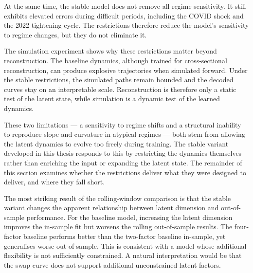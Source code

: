 At the same time, the stable model does not remove all regime sensitivity. It still exhibits elevated errors during difficult periods, including the COVID shock and the 2022 tightening cycle. The restrictions therefore reduce the model's sensitivity to regime changes, but they do not eliminate it.

The simulation experiment shows why these restrictions matter beyond reconstruction. The baseline dynamics, although trained for cross-sectional reconstruction, can produce explosive trajectories when simulated forward. Under the stable restrictions, the simulated paths remain bounded and the decoded curves stay on an interpretable scale. Reconstruction is therefore only a static test of the latent state, while simulation is a dynamic test of the learned dynamics.

These two limitations --- a sensitivity to regime shifts and a structural inability to reproduce slope and curvature in atypical regimes --- both stem from allowing the latent dynamics to evolve too freely during training. The stable variant developed in this thesis responds to this by restricting the dynamics themselves rather than enriching the input or expanding the latent state. The remainder of this section examines whether the restrictions deliver what they were designed to deliver, and where they fall short.




The most striking result of the rolling-window comparison is that the stable variant changes the apparent relationship between latent dimension and out-of-sample performance. For the baseline model, increasing the latent dimension improves the in-sample fit but worsens the rolling out-of-sample results. The four-factor baseline performs better than the two-factor baseline in-sample, yet generalises worse out-of-sample. This is consistent with a model whose additional flexibility is not sufficiently constrained. A natural interpretation would be that the swap curve does not support additional unconstrained latent factors.

